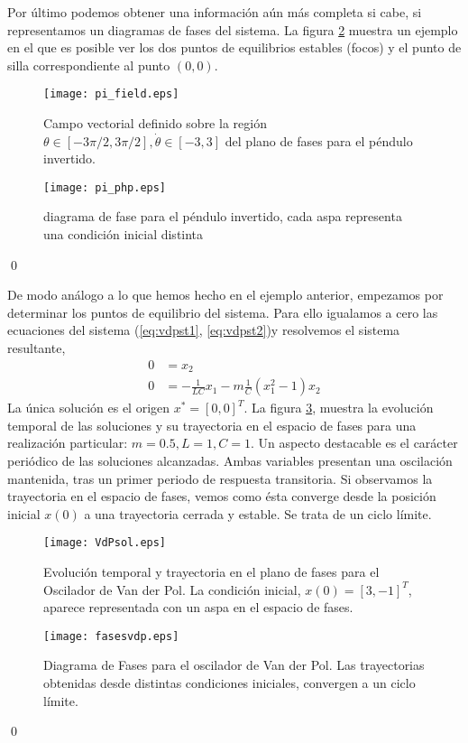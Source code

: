 \begin{example}
Por último podemos obtener una información aún más completa si cabe, si representamos un diagramas de fases del sistema.  La figura \ref{fig:piphp} muestra un ejemplo en el que es posible ver los dos puntos de equilibrios estables (focos) y el punto de silla correspondiente al punto $(0,0)$. 

 
\begin{figure}
\centering
\texttt{[image: pi\_field.eps]}
\caption{Campo vectorial definido sobre la región  $\theta \in [-3\pi/2,3\pi/2], \dot \theta \in [-3,3]$ del plano de fases para el péndulo invertido. } \label{fig:pifield}
\end{figure}

 \begin{figure}
\centering
\texttt{[image: pi\_php.eps]}
\caption{diagrama de fase para el péndulo invertido, cada aspa representa una condición inicial distinta} \label{fig:piphp}
\end{figure}
\qed
\end{example}

\begin{example} De modo análogo a lo que hemos hecho en el ejemplo anterior, empezamos por determinar los puntos de equilibrio del sistema. Para ello igualamos a cero las ecuaciones del sistema (\ref{eq:vdpst1}, \ref{eq:vdpst2})y resolvemos el sistema resultante,
\begin{align}
0 &= x_2\\
0 &= -\frac{1}{LC}x_1 - m\frac{1}{C}(x_1^2-1)x_2 
\end{align}
La única solución es el origen $x^*=[0,0]^T$. La figura \ref{fig:vandesol}, muestra la evolución temporal de las soluciones y su trayectoria en el espacio de fases para una realización particular: $m = 0.5, L=1,C=1$. Un aspecto destacable es el carácter periódico de las soluciones alcanzadas. Ambas variables presentan una oscilación mantenida, tras un primer periodo de respuesta transitoria. Si observamos la trayectoria en el espacio de fases, vemos como ésta converge desde la posición inicial $x(0)$ a una trayectoria cerrada y estable. Se trata de un ciclo límite. 

\begin{figure}
\centering
\texttt{[image: VdPsol.eps]}
\caption{Evolución temporal y trayectoria en el plano de fases para el Oscilador de Van der Pol. La condición inicial, $x(0)=[3,-1]^T$, aparece representada con un aspa en el espacio de fases.} \label{fig:vandesol}
\end{figure}

\begin{figure}
\centering
\texttt{[image: fasesvdp.eps]}
\caption{Diagrama de Fases para el oscilador de Van der Pol. Las trayectorias obtenidas desde distintas condiciones iniciales, convergen a un ciclo límite.} \label{fig:fasesvdp}
\end{figure}
\qed
\end{example}

